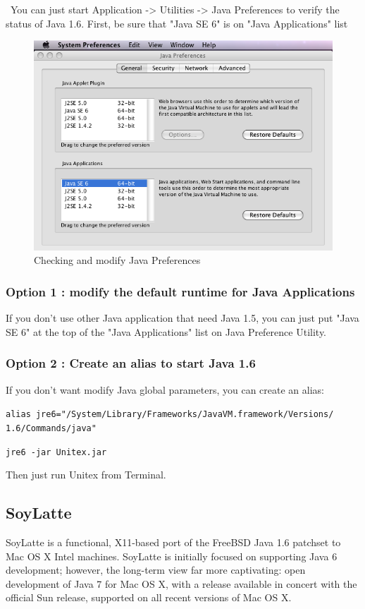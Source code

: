 \noindent\ You can just start Application -> Utilities -> Java Preferences to verify the status of Java 1.6. First, be sure that "Java SE 6" is on "Java Applications" list
\begin{figure}[!h]
\begin{center}
\includegraphics[width=13cm]{resources/img/java_pref_osx.png}
\caption{Checking and modify Java Preferences\label{fig-mac0}}
\end{center}
\end{figure}


\subsubsection{Option 1 : modify the default runtime for Java Applications}
\noindent If you don't use other Java application that need Java 1.5, you can just put "Java SE 6" at the top of the "Java Applications" list on Java Preference Utility.

\subsubsection{Option 2 : Create an alias to start Java 1.6}
\noindent If you don't want modify Java global parameters, you can create an
alias:

\bigskip
\noindent \verb+alias jre6="/System/Library/Frameworks/JavaVM.framework/Versions/+
\noindent \verb+1.6/Commands/java"+
   
\bigskip
\noindent \verb+jre6 -jar Unitex.jar+

\bigskip
\noindent Then just run Unitex from Terminal.

\subsection{SoyLatte}
\bigskip{}
\noindent SoyLatte is a functional, X11-based port of the FreeBSD
Java 1.6 patchset to Mac OS X Intel machines. SoyLatte is initially focused on 
supporting Java 6 development; however, the long-term view far more captivating: 
open development of Java 7 for Mac OS X, with a release available in concert 
with the official Sun release, supported on all recent versions of Mac OS X.

